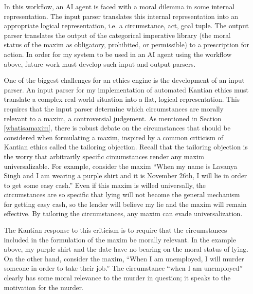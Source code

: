 \begin{isabellebody}
\begin{isamarkuptext}
In this workflow, an AI agent is faced with a moral dilemma in some internal representation. The input
parser translates this internal representation into an appropriate logical representation, i.e. 
a circumstance, act, goal tuple. The output parser translates the output of the categorical imperative
library (the moral status of the maxim as obligatory, prohibited, or permissible) to a prescription for
action. In order for my system to be used in an AI agent using the workflow
above, future work must develop such input and output parsers.

One of the biggest challenges for an ethics engine is the development of an input parser. An input parser 
for my implementation of automated Kantian ethics must translate a complex real-world situation into a flat, logical representation.
This requires that the input parser determine which circumstances are morally relevant
to a maxim, a controversial judgement. As mentioned in Section \ref{whatisamaxim},
there is robust debate on the circumstances that should be considered when formulating a maxim, 
inspired by a common criticism of Kantian ethics called the tailoring objection. Recall that the 
tailoring objection is the worry that arbitrarily specific 
circumstances render any maxim universalizable. For example, consider the maxim ``When my name is Lavanya Singh 
and I am wearing a purple shirt and it is November 26th, I will lie in order to get some easy cash.'' 
Even if this maxim is willed universally, the circumstances are so 
specific that lying will not become the general mechanism for getting easy cash, so the lender will 
believe my lie and the maxim will remain effective. By tailoring the circumstances, any maxim can 
evade universalization.

The Kantian response to this criticism is to require that the circumstances included in the formulation
of the maxim be morally relevant. In the example above, my purple shirt and the date have no bearing on 
the moral status of lying. On the other hand, consider the maxim, ``When I am unemployed, I will murder
someone in order to take their job.'' The circumstance ``when I am unemployed'' clearly has some moral
relevance to the murder in question; it speaks to the motivation for the murder. 


\end{isamarkuptext}
\end{isabellebody}
